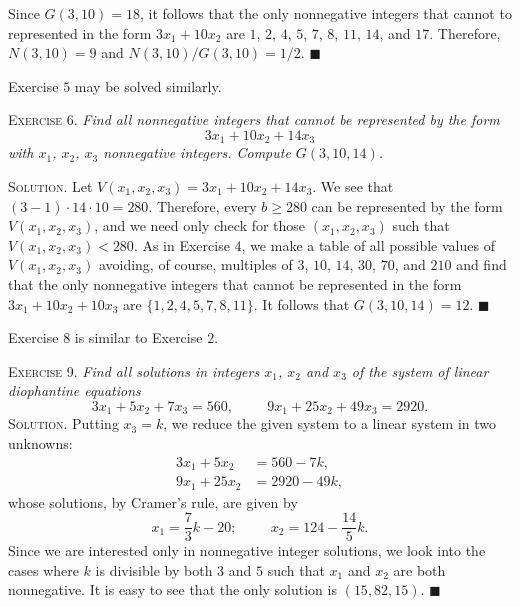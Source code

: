 \documentclass[11pt, leqno]{article}
\newcommand{\done}{\ensuremath{\blacksquare}}
\begin{document}
Since $G(3,10)=18$, it follows that the only nonnegative integers that cannot to represented in the form $3x_1 + 10x_2$ are $1$, $2$, $4$, $5$, $7$, $8$, $11$, $14$, and $17$. Therefore, $N(3,10) = 9$ and $N(3,10)/G(3,10) = 1/2$. \done

Exercise $5$ may be solved similarly.

\textsc{Exercise 6}. \emph{Find all nonnegative integers that cannot be represented by the form 
\begin{displaymath}
3x_1 + 10x_2 + 14x_3
\end{displaymath}
with $x_1$, $x_2$, $x_3$ nonnegative integers. Compute $G(3,10,14)$.}

\textsc{Solution}. Let $V(x_1, x_2, x_3) = 3x_1 + 10x_2 + 14x_3$. We see that $(3-1)\cdot 14 \cdot 10 = 280$. Therefore, every $b\geq 280$ can be represented by the form $V(x_1, x_2, x_3)$, and we need only check for those $(x_1, x_2, x_3)$ such that $V(x_1, x_2, x_3) < 280$. As in Exercise $4$, we make a table of all possible values of $V(x_1, x_2, x_3)$ avoiding, of course, multiples of $3$, $10$, $14$, $30$, $70$, and $210$ and find that the only nonnegative integers that cannot be represented in the form $3x_1 + 10x_2 + 10x_3$ are $\{ 1, 2, 4, 5, 7, 8, 11 \}$. It follows that $G(3,10,14) = 12$. \done

Exercise $8$ is similar to Exercise $2$.

\textsc{Exercise 9}. \emph{Find all solutions in integers $x_1$, $x_2$ and $x_3$ of the system of linear diophantine equations 
\begin{displaymath}
  3x_1 + 5x_2 + 7x_3 = 560, \hspace{1cm}
  9x_1 + 25x_2 + 49x_3 = 2920.
\end{displaymath}}\textsc{Solution}. Putting $x_3 = k$, we reduce the given system to a linear system in two unknowns: 
\begin{align*}
  3x_1 + 5x_2 &= 560 - 7k, \\
  9x_1 + 25x_2 &= 2920 - 49k,
\end{align*}
whose solutions, by Cramer's rule, are given by 
\begin{displaymath}
x_1 = \frac{7}{3}k - 20; \hspace{1cm} x_2 = 124 - \frac{14}{5}k.
\end{displaymath}
Since we are interested only in nonnegative integer solutions, we look into the cases where $k$ is divisible by both $3$ and $5$ such that $x_1$ and $x_2$ are both nonnegative. It is easy to see that the only solution is $(15, 82, 15)$. \done
\end{document}
